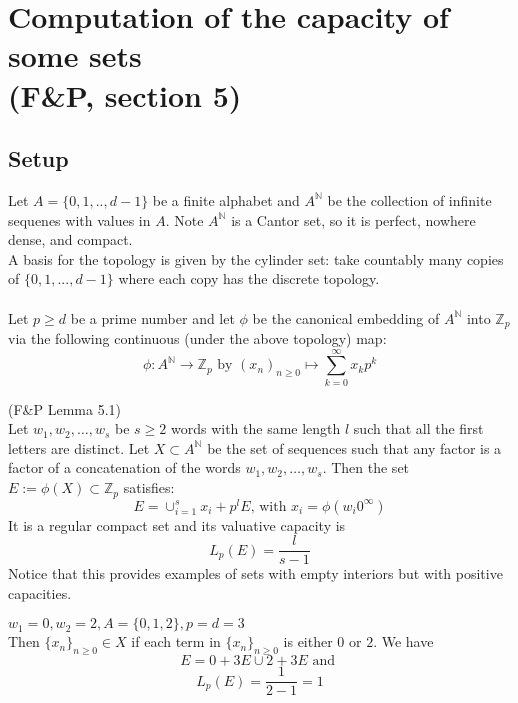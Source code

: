\section*{Computation of the capacity of some sets\\ (F\&P, section 5)}
\subsection*{Setup}
Let $A=\{0,1,..,d-1\}$ be a finite alphabet and $A^{\mathbb{N}}$ be the collection of infinite sequenes with values in $A$. Note $A^{\mathbb{N}}$ is a Cantor set, so it is perfect, nowhere dense, and compact.  \\

A basis for the topology is given by the cylinder set: take countably many copies of $\{0,1,...,d-1\}$ where each copy has the discrete topology.\\\\ Let $p \geq d$ be a prime number and let $\phi$ be the canonical embedding of $A^\mathbb{N}$ into $\mathbb{Z}_p$ via the following continuous (under the above topology) map: \[ \phi: A^{\mathbb{N}} \rightarrow \mathbb{Z}_p \text{ by } (x_n)_{n\geq0} \mapsto \sum_{k=0}^\infty x_kp^k\]

\begin{lemma*} (F\&P Lemma 5.1)\\ Let $w_1,w_2,\ldots,w_s$ be $s\geq 2$ words with the same length $l$ such that all the first letters are distinct. Let $X \subset A^{\mathbb{N}}$ be the set of sequences such that any factor is a factor of a concatenation of the words $w_1,w_2,\ldots,w_s$. Then the set $E := \phi(X) \subset \mathbb{Z}_p$ satisfies: \[E=\cup_{i=1}^s x_i +p^l E \text{,   with } x_i=\phi(w_i0^\infty)\]
It is a regular compact set and its valuative capacity is \[L_p(E) = \frac{l}{s-1}\] Notice that this provides examples of sets with empty interiors but with positive capacities.
\end{lemma*}
\begin{example}
	$w_1=0, w_2=2,  A=\{0,1,2\}, p=d=3$\\
	Then $\{x_n\}_{n\geq0} \in X$ if each term in  $\{x_n\}_{n\geq0}$ is either $0$ or $2$. We have \[E=0 + 3E \cup 2 + 3E \text{ and }\]  \[L_p(E) = \frac{1}{2-1} =1\] 
\end{example}

